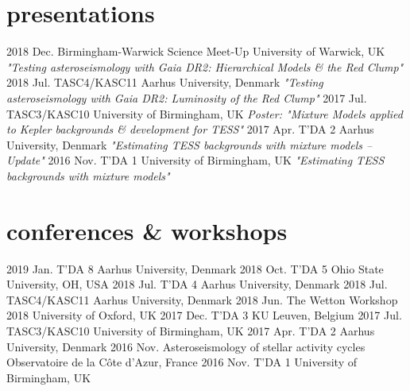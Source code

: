 \documentclass[]{k-cv} %
\begin{document}
\section{presentations}

\begin{entrylist}
\entry
{2018 Dec.}
{Birmingham-Warwick Science Meet-Up}
{University of Warwick, UK}
{\emph{"Testing asteroseismology with \textit{Gaia} DR2: Hierarchical Models \& the Red Clump"}}
\entry
{2018 Jul.}
{TASC4/KASC11}
{Aarhus University, Denmark}
{\emph{"Testing asteroseismology with \textit{Gaia} DR2: Luminosity of the Red Clump"}}
\entry
{2017 Jul.}
{TASC3/KASC10}
{University of Birmingham, UK}
{\emph{Poster: "Mixture Models applied to \emph{Kepler} backgrounds \& development for TESS"}}
\entry
{2017 Apr.}
{T'DA 2}
{Aarhus University, Denmark}
{\emph{"Estimating TESS backgrounds with mixture models -- Update"}}
\entry
{2016 Nov.}
{T'DA 1}
{University of Birmingham, UK}
{\emph{"Estimating TESS backgrounds with mixture models"}}
\end{entrylist}

\section{conferences \& workshops}

\begin{entrylist}
\entrythree
{2019 Jan.}
{T'DA 8}
{Aarhus University, Denmark}
\entrythree
{2018 Oct.}
{T'DA 5}
{Ohio State University, OH, USA}
\entrythree
{2018 Jul.}
{T'DA 4}
{Aarhus University, Denmark}
\entrythree
{2018 Jul.}
{TASC4/KASC11}
{Aarhus University, Denmark}
\entrythree
{2018 Jun.}
{The Wetton Workshop 2018}
{University of Oxford, UK}
\entrythree
{2017 Dec.}
{T'DA 3}
{KU Leuven, Belgium}
\entrythree
{2017 Jul.}
{TASC3/KASC10}
{University of Birmingham, UK}
\entrythree
{2017 Apr.}
{T'DA 2}
{Aarhus University, Denmark}
\entrythree
{2016 Nov.}
{Asteroseismology of stellar activity cycles}
{Observatoire de la C\^{o}te d'Azur, France}
\entrythree
{2016 Nov.}
{T'DA 1}
{University of Birmingham, UK}
\end{entrylist}
\end{document}
